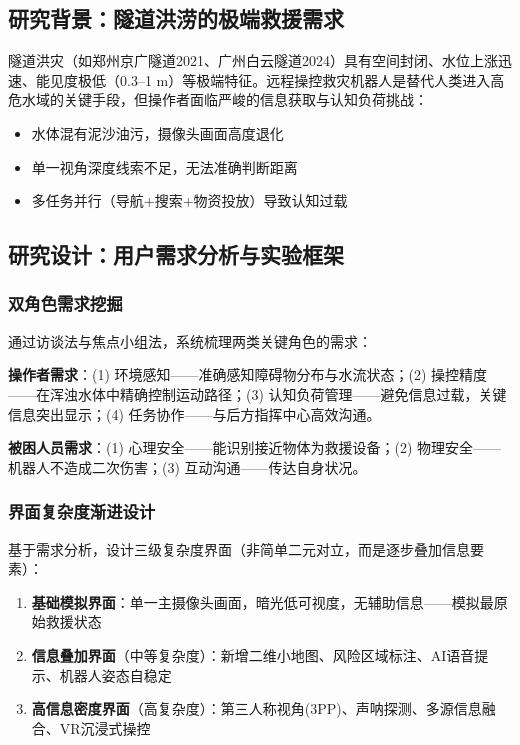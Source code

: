 \documentclass[12pt,a4paper]{ctexart}
\begin{document}
\subsection{研究背景：隧道洪涝的极端救援需求}

隧道洪灾（如郑州京广隧道2021、广州白云隧道2024）具有空间封闭、水位上涨迅速、能见度极低（0.3--1 m）等极端特征。远程操控救灾机器人是替代人类进入高危水域的关键手段，但操作者面临严峻的信息获取与认知负荷挑战：

\begin{itemize}
    \item 水体混有泥沙油污，摄像头画面高度退化
    \item 单一视角深度线索不足，无法准确判断距离
    \item 多任务并行（导航+搜索+物资投放）导致认知过载
\end{itemize}

\subsection{研究设计：用户需求分析与实验框架}

\subsubsection{双角色需求挖掘}

通过访谈法与焦点小组法，系统梳理两类关键角色的需求：

\textbf{操作者需求}：(1) 环境感知——准确感知障碍物分布与水流状态；(2) 操控精度——在浑浊水体中精确控制运动路径；(3) 认知负荷管理——避免信息过载，关键信息突出显示；(4) 任务协作——与后方指挥中心高效沟通。

\textbf{被困人员需求}：(1) 心理安全——能识别接近物体为救援设备；(2) 物理安全——机器人不造成二次伤害；(3) 互动沟通——传达自身状况。

\subsubsection{界面复杂度渐进设计}

基于需求分析，设计三级复杂度界面（非简单二元对立，而是逐步叠加信息要素）：

\begin{enumerate}
    \item \textbf{基础模拟界面}：单一主摄像头画面，暗光低可视度，无辅助信息——模拟最原始救援状态
    \item \textbf{信息叠加界面}（中等复杂度）：新增二维小地图、风险区域标注、AI语音提示、机器人姿态自稳定
    \item \textbf{高信息密度界面}（高复杂度）：第三人称视角(3PP)、声呐探测、多源信息融合、VR沉浸式操控
\end{enumerate}
\end{document}
